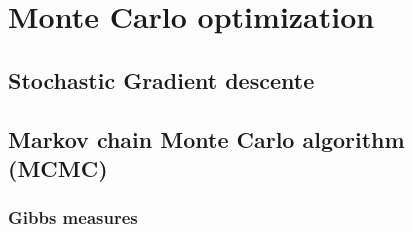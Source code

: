 \documentclass{article}\usepackage[]{graphicx}\usepackage[]{xcolor}
\begin{document}
\newpage
\section{Monte Carlo optimization}

\subsection{Stochastic Gradient descente}



\subsection{Markov chain Monte Carlo algorithm (MCMC)}

\subsubsection{Gibbs measures}




\newpage



\end{document}
